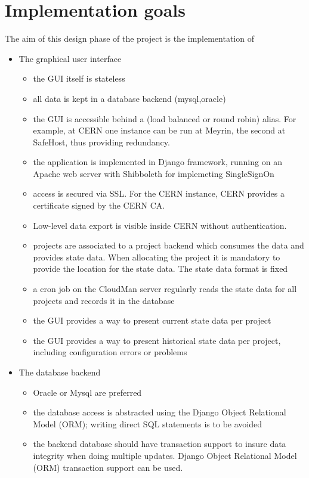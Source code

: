 \section{Implementation goals}
The aim of this design phase of the project is the implementation of 
\begin{itemize}
\item The graphical user interface 
\begin{itemize}
  \item the GUI itself is stateless
  \item all data is kept in a database backend (mysql,oracle)
  \item the GUI is accessible behind a (load balanced or round robin) alias. For example, at CERN one instance can be run at Meyrin, the second at SafeHost, thus providing redundancy.
  \item the application is implemented in Django\cite{Django} framework, running on an Apache web server with Shibboleth for implemeting SingleSignOn   
  \item access is secured via SSL. For the CERN instance, CERN provides a certificate signed by the CERN CA.
  \item Low-level data export is visible inside CERN without authentication.
  \item projects are associated to a project backend which consumes the data and provides state data. When allocating the project it is mandatory to provide the location for the state data. The state data format is fixed
  \item a cron job on the CloudMan server regularly reads the state data for all projects and records it in the database
  \item the GUI provides a way to present current state data per project
  \item the GUI provides a way to present historical state data per project, including configuration errors or problems 
\end{itemize}
\item The database backend
\begin{itemize}
  \item Oracle or Mysql are preferred
  \item the database access is abstracted using the Django Object Relational Model (ORM)\cite{ORM}; writing direct SQL statements is to be avoided
  \item the backend database should have transaction support to insure data integrity when doing multiple updates. Django Object Relational Model (ORM)\cite{ORM} transaction support can be used.

\end{itemize}
\end{itemize}

